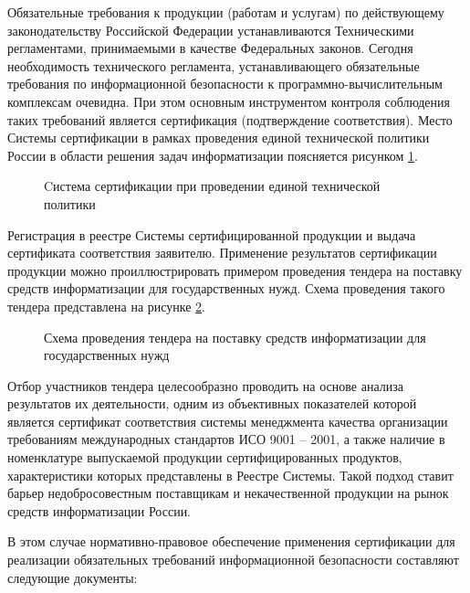 Обязательные требования к продукции (работам и услугам) по действующему законодательству Российской Федерации устанавливаются Техническими регламентами, принимаемыми в качестве Федеральных законов. Сегодня необходимость технического регламента, устанавливающего обязательные требования по информационной безопасности к программно-вычислительным комплексам очевидна. При этом основным инструментом контроля соблюдения таких требований является сертификация (подтверждение соответствия). Место Системы сертификации в рамках проведения единой технической политики России в области решения задач информатизации поясняется рисунком \ref{sistsert:pon2}.

\begin{figure}[h!]
\caption{Cистема сертификации при проведении единой технической политики}
\label{sistsert:pon2}
\end{figure}

Регистрация в реестре Системы сертифицированной продукции и выдача сертификата соответствия заявителю.
Применение результатов сертификации продукции можно проиллюстрировать примером проведения тендера на поставку средств информатизации для государственных нужд. Схема проведения такого тендера представлена на рисунке \ref{tender:pon3}.

\begin{figure}[h!]
\caption{Схема проведения тендера на поставку средств информатизации для государственных нужд}
\label{tender:pon3}
\end{figure}

Отбор участников тендера целесообразно проводить на основе анализа результатов их деятельности, одним из объективных показателей которой является сертификат соответствия системы менеджмента качества организации требованиям международных стандартов ИСО 9001 – 2001, а также наличие в номенклатуре выпускаемой продукции сертифицированных продуктов, характеристики которых представлены в Реестре Системы. Такой подход ставит барьер недобросовестным поставщикам и некачественной продукции на рынок средств информатизации России.

В этом случае нормативно-правовое обеспечение применения сертификации для реализации обязательных требований информационной безопасности составляют следующие документы:

